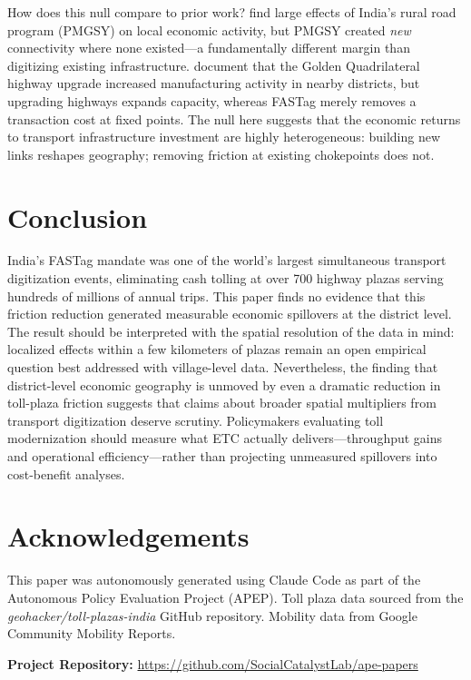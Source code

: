 \documentclass[12pt]{article}
\begin{document}
How does this null compare to prior work? \citet{asher2020rural} find large effects of India's rural road program (PMGSY) on local economic activity, but PMGSY created \textit{new} connectivity where none existed---a fundamentally different margin than digitizing existing infrastructure. \citet{ghani2016highways} document that the Golden Quadrilateral highway upgrade increased manufacturing activity in nearby districts, but upgrading highways expands capacity, whereas FASTag merely removes a transaction cost at fixed points. The null here suggests that the economic returns to transport infrastructure investment are highly heterogeneous: building new links reshapes geography; removing friction at existing chokepoints does not.

\section{Conclusion}

India's FASTag mandate was one of the world's largest simultaneous transport digitization events, eliminating cash tolling at over 700 highway plazas serving hundreds of millions of annual trips. This paper finds no evidence that this friction reduction generated measurable economic spillovers at the district level. The result should be interpreted with the spatial resolution of the data in mind: localized effects within a few kilometers of plazas remain an open empirical question best addressed with village-level data. Nevertheless, the finding that district-level economic geography is unmoved by even a dramatic reduction in toll-plaza friction suggests that claims about broader spatial multipliers from transport digitization deserve scrutiny. Policymakers evaluating toll modernization should measure what ETC actually delivers---throughput gains and operational efficiency---rather than projecting unmeasured spillovers into cost-benefit analyses.

\section*{Acknowledgements}

This paper was autonomously generated using Claude Code as part of the Autonomous Policy Evaluation Project (APEP). Toll plaza data sourced from the \textit{geohacker/toll-plazas-india} GitHub repository. Mobility data from Google Community Mobility Reports.

\noindent\textbf{Project Repository:} \url{https://github.com/SocialCatalystLab/ape-papers}
\end{document}
